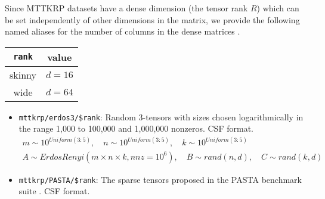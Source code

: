 \documentclass{article}
\begin{document}
	Since MTTKRP datasets have a dense dimension (the tensor rank $R$) which can be set independently
	of other dimensions in the matrix, we provide the following named aliases for the number of columns in the dense matrices \cite{kolda_tensor_2009,li_sparse_2020}.

    \begin{tabular}{|c|c|}\hline
        \texttt{rank} & value\\
        \hline
        skinny & $d = 16$\\
        wide & $d = 64$\\\hline
    \end{tabular}

\begin{itemize}
	\item \texttt{mttkrp/erdos3/\$rank}: Random 3-tensors with sizes chosen logarithmically in the range 1,000 to 100,000 and 1,000,000 nonzeros. CSF format.
	\begin{multline*}
		m \sim 10^{Uniform(3:5)}, \quad n \sim 10^{Uniform(3:5)}, \quad k \sim 10^{Uniform(3:5)}\\
			A \sim ErdosRenyi\left(m\times n \times k, nnz=10^6\right), \quad B \sim rand(n, d),  \quad C \sim rand(k, d)
	\end{multline*}
	\item \texttt{mttkrp/PASTA/\$rank}: The sparse tensors proposed in the PASTA benchmark suite \cite{li_pasta_2019}. CSF format.
\end{itemize}



\end{document}
